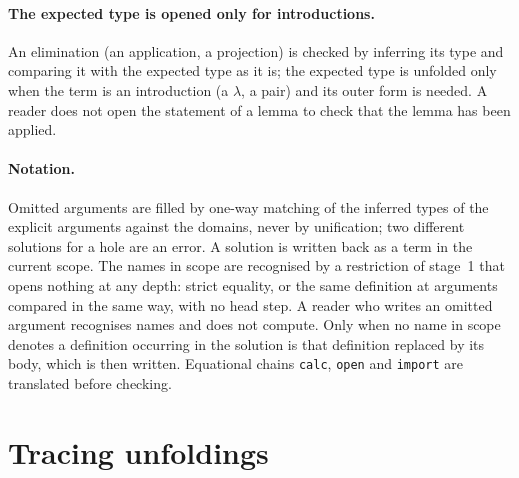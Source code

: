 \documentclass[11pt]{article}
\newcommand{\kw}[1]{\texttt{#1}}
\begin{document}
\paragraph{The expected type is opened only for introductions.} An elimination (an application, a
projection) is checked by inferring its type and comparing it with the
expected type as it is; the expected type is unfolded only when the term
is an introduction (a $\lambda$, a pair) and its outer form is needed.
A reader does not open the statement of a lemma to check that the lemma
has been applied.

\paragraph{Notation.} Omitted arguments are filled by one-way matching
of the inferred types of the explicit arguments against the domains,
never by unification; two different solutions for a hole are an error.
A solution is written back as a term in the current scope. The names in
scope are recognised by a restriction of stage~1 that opens nothing at
any depth: strict equality, or the same definition at arguments compared
in the same way, with no head step. A reader who writes an omitted
argument recognises names and does not compute. Only when no name in
scope denotes a definition occurring in the solution is that definition
replaced by its body, which is then written. Equational chains
\kw{calc}, \kw{open} and \kw{import} are translated before checking.

\section{Tracing unfoldings}\label{sec:method}
\end{document}
